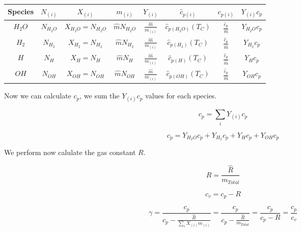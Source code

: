 \documentclass[12pt, Times New Roman]{article}
\begin{document}
    \begin{center}
        \begin{tabular}{|c|c|c|c|c|c|c|c|}
            \hline
            Species & $N_{(i)}$ & $X_{(i)}$ & $m_{(i)}$ &  $Y_{(i)}$ & $\hat{c}_{p(i)}$ & $c_{p(i)}$ & $Y_{(i)}c_{p}$ \\
            \hline
            $H_{2}O$ & $N_{H_{2}O}$ & $X_{H_{2}O} = N_{H_{2}O}$ & $\hat{m}N_{H_{2}O}$ & $\frac{\hat{m}}{m_{(i)}}$ & $\hat{c}_{p(H_{2}O)}(T_{C})$ & $\frac{\hat{c}_{p}}{\hat{m}}$ & $Y_{H_{2}O}c_{p}$ \\
            \hline
            $H_{2}$ & $N_{H_{2}}$ & $X_{H_{2}} = N_{H_{2}}$ & $\hat{m}N_{H_{2}}$ & $\frac{\hat{m}}{m_{(i)}}$ & $\hat{c}_{p(H_{2})}(T_{C})$ & $\frac{\hat{c}_{p}}{\hat{m}}$ & $Y_{H_{2}}c_{p}$ \\
            \hline
            $H$ & $N_{H}$ & $X_{H} = N_{H}$ & $\hat{m}N_{H}$ & $\frac{\hat{m}}{m_{(i)}}$ & $\hat{c}_{p(H)}(T_{C})$ & $\frac{\hat{c}_{p}}{\hat{m}}$ & $Y_{H}c_{p}$ \\
            \hline
            $OH$ & $N_{OH}$ & $X_{OH} = N_{OH}$ & $\hat{m}N_{OH}$ & $\frac{\hat{m}}{m_{(i)}}$ & $\hat{c}_{p(OH)}(T_{C})$ & $\frac{\hat{c}_{p}}{\hat{m}}$ & $Y_{OH}c_{p}$ \\
            \hline
        \end{tabular}
    \end{center}

    Now we can calculate $c_{p}$, we sum the $Y_{(i)}c_{p}$ values for each species.

    \begin{equation}
        c_{p} = \sum_{i} Y_{(i)}c_{p}
    \end{equation}

    \begin{equation}
        c_{p} = Y_{H_{2}O}c_{p} + Y_{H_{2}}c_{p} + Y_{H}c_{p} + Y_{OH}c_{p}
    \end{equation}

    We perform now calulate the gas constant $R$.

    \begin{equation}
        R = \frac{\hat{R}}{m_{Total}}
    \end{equation}

    \begin{equation}
        c_{v} = c_{p} - R
    \end{equation}

    \begin{equation}
        \gamma = \frac{c_{p}}{c_{p} - \frac{\hat{R}}{\sum_{i} X_{(i)}m_{(i)}}} = \frac{c_{p}}{c_{p}- \frac{\hat{R}}{m_{Total}}} = \frac{c_{p}}{c_{p}- R} = \frac{c_{p}}{c_{v}}
    \end{equation}
    
\end{document}
